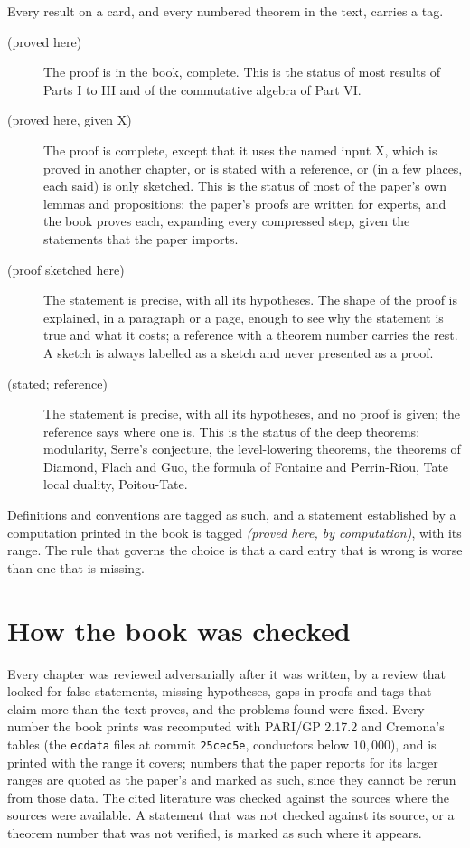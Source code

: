 Every result on a card, and every numbered theorem in the text, carries a tag.
\begin{description}
\item[(proved here)] The proof is in the book, complete. This is the status of most results of
Parts I to III and of the commutative algebra of Part VI.
\item[(proved here, given X)] The proof is complete, except that it uses the named input X, which
is proved in another chapter, or is stated with a reference, or (in a few places, each said) is
only sketched. This is the status of most of the paper's own lemmas and propositions: the paper's
proofs are written for experts, and the book proves each, expanding every compressed step, given
the statements that the paper imports.
\item[(proof sketched here)] The statement is precise, with all its hypotheses. The shape of the
proof is explained, in a paragraph or a page, enough to see why the statement is true and what it
costs; a reference with a theorem number carries the rest. A sketch is always labelled as a sketch
and never presented as a proof.
\item[(stated; reference)] The statement is precise, with all its hypotheses, and no proof is
given; the reference says where one is. This is the status of the deep theorems: modularity,
Serre's conjecture, the level-lowering theorems, the theorems of Diamond, Flach and Guo, the
formula of Fontaine and Perrin-Riou, Tate local duality, Poitou-Tate.
\end{description}
Definitions and conventions are tagged as such, and a statement established by a computation
printed in the book is tagged \emph{(proved here, by computation)}, with its range. The rule that
governs the choice is that a card entry that is wrong is worse than one that is missing.

\section*{How the book was checked}

Every chapter was reviewed adversarially after it was written, by a review that looked for false
statements, missing hypotheses, gaps in proofs and tags that claim more than the text proves, and
the problems found were fixed. Every number the book prints was recomputed with PARI/GP 2.17.2 and
Cremona's tables (the \texttt{ecdata} files at commit \texttt{25cec5e}, conductors below
$10{,}000$), and is printed with the range it covers; numbers that the paper reports for its larger
ranges are quoted as the paper's and marked as such, since they cannot be rerun from those data.
The cited literature was checked against the sources where the sources were available. A statement
that was not checked against its source, or a theorem number that was not verified, is marked as
such where it appears.

